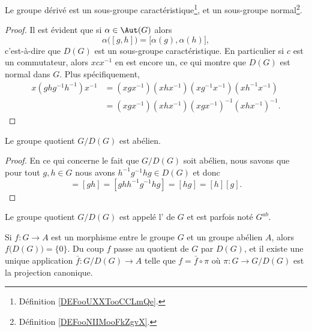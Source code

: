 \begin{lemma}   \label{LemMMOCooDJJJhy}
	Le groupe dérivé est un sous-groupe caractéristique\footnote{Définition \ref{DEFooUXXTooCCLmQe}.}, et un sous-groupe normal\footnote{Définition \ref{DEFooNIIMooFkZgvX}.}.
\end{lemma}

\begin{proof}
	Il est évident que si \( \alpha\in\Aut(G)\) alors
	\begin{equation}
		\alpha\big( [g,h] \big)=\big[ \alpha(g),\alpha(h) \big],
	\end{equation}
	c'est-à-dire que \( D(G)\) est un sous-groupe caractéristique. En particulier si \( c\) est un commutateur, alors \( xcx^{-1}\) en est encore un, ce qui montre que \( D(G)\) est normal dans \( G\). Plus spécifiquement,
	\begin{subequations}
		\begin{align}
			x(ghg^{-1}h^{-1})x^{-1} & =(xgx^{-1})(xhx^{-1})(xg^{-1}x^{-1})(xh^{-1}x^{-1})  \\
			                        & =(xgx^{-1})(xhx^{-1})(xgx^{-1})^{-1}(xhx^{-1})^{-1}.
		\end{align}
	\end{subequations}
\end{proof}

\begin{proposition}\label{PropAPRGooHBkELf}
	Le groupe quotient \( G/D(G)\) est abélien.
\end{proposition}

\begin{proof}
	En ce qui concerne le fait que \( G/D(G)\) soit abélien, nous savons que pour tout \( g,h\in G\) nous avons \( h^{-1}g^{-1}hg\in D(G)\) et donc
	\begin{equation}
		[g][h]=[gh]=[ghh^{-1}g^{-1}hg]=[hg]=[h][g].
	\end{equation}
\end{proof}

Le groupe quotient \( G/D(G)\) est appelé l' de \( G\) et est parfois noté \( G^{ab}\).

Si \( f\colon G\to A\) est un morphisme entre le groupe \( G\) et un groupe abélien \( A\), alors \( f\big( D(G) \big)=\{ 0 \}\). Du coup \( f\) passe au quotient de \( G\) par \( D(G)\), et il existe une unique application \( \bar f\colon G/D(G)\to A\) telle que \( f=\bar f\circ \pi\) où \( \pi\colon G\to G/D(G)\) est la projection canonique.

